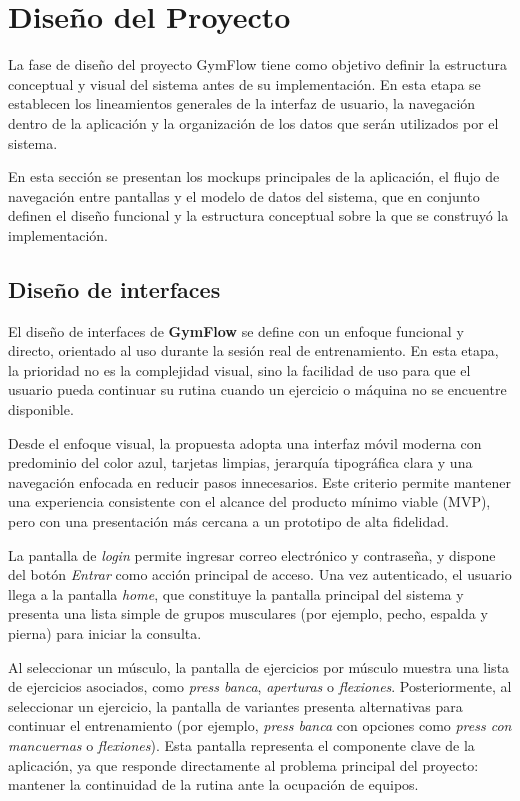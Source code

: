 \section{Diseño del Proyecto}

La fase de diseño del proyecto GymFlow tiene como objetivo definir la estructura conceptual y visual del sistema antes de su implementación. En esta etapa se establecen los lineamientos generales de la interfaz de usuario, la navegación dentro de la aplicación y la organización de los datos que serán utilizados por el sistema.

En esta sección se presentan los mockups principales de la aplicación, el flujo de navegación entre pantallas y el modelo de datos del sistema, que en conjunto definen el diseño funcional y la estructura conceptual sobre la que se construyó la implementación.

\subsection{Diseño de interfaces}

El diseño de interfaces de \textbf{GymFlow} se define con un enfoque funcional y directo, orientado al uso durante la sesión real de entrenamiento. En esta etapa, la prioridad no es la complejidad visual, sino la facilidad de uso para que el usuario pueda continuar su rutina cuando un ejercicio o máquina no se encuentre disponible.

Desde el enfoque visual, la propuesta adopta una interfaz móvil moderna con predominio del color azul, tarjetas limpias, jerarquía tipográfica clara y una navegación enfocada en reducir pasos innecesarios. Este criterio permite mantener una experiencia consistente con el alcance del producto mínimo viable (MVP), pero con una presentación más cercana a un prototipo de alta fidelidad.

La pantalla de \textit{login} permite ingresar correo electrónico y contraseña, y dispone del botón \textit{Entrar} como acción principal de acceso. Una vez autenticado, el usuario llega a la pantalla \textit{home}, que constituye la pantalla principal del sistema y presenta una lista simple de grupos musculares (por ejemplo, pecho, espalda y pierna) para iniciar la consulta.

Al seleccionar un músculo, la pantalla de ejercicios por músculo muestra una lista de ejercicios asociados, como \textit{press banca}, \textit{aperturas} o \textit{flexiones}. Posteriormente, al seleccionar un ejercicio, la pantalla de variantes presenta alternativas para continuar el entrenamiento (por ejemplo, \textit{press banca} con opciones como \textit{press con mancuernas} o \textit{flexiones}). Esta pantalla representa el componente clave de la aplicación, ya que responde directamente al problema principal del proyecto: mantener la continuidad de la rutina ante la ocupación de equipos.

